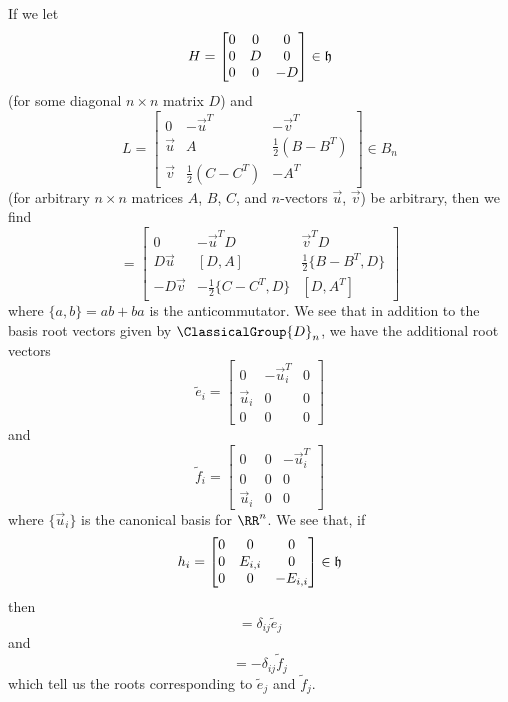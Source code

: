 If we let
\begin{equation}
H = \begin{bmatrix} 0&0&0\\
0&D&0\\
0&0&-D
\end{bmatrix}\in\frak{h}
\end{equation}
(for some diagonal $n\times n$ matrix $D$) and
\begin{equation}
L=\begin{bmatrix}0&-\vec{u}^{T}&-\vec{v}^{T}\\
\vec{u}&A&\frac{1}{2}(B-B^{T})\\
\vec{v}&\frac{1}{2}(C-C^{T})&-A^{T}
\end{bmatrix}\in B_{n}
\end{equation}
(for arbitrary $n\times n$ matrices $A$, $B$, $C$, and
$n$-vectors $\vec{u}$, $\vec{v}$) be arbitrary, then we find
\begin{equation}
[H,L]=\begin{bmatrix} 0 & -\vec{u}^{T}D & \vec{v}^{T}D\\
D\vec{u}   & [D,A]                     & \frac{1}{2}\{B-B^{T},D\}\\
-D\vec{v}  & -\frac{1}{2}\{C-C^{T},D\} & [D,A^{T}]
\end{bmatrix}
\end{equation}
where $\{a,b\}=ab+ba$ is the anticommutator. We see that in
addition to the basis root vectors given by $\ClassicalGroup{D}_{n}$, we have the
additional root vectors
\begin{equation}
\widetilde{e}_{i}=\begin{bmatrix} 0 & -\vec{u}^{T}_{i} & 0\\
\vec{u}_{i}   & 0 & 0\\
0  & 0 & 0
\end{bmatrix}
\end{equation}
 and
\begin{equation}
\widetilde{f}_{i}=\begin{bmatrix} 0 & 0 & -\vec{u}^{T}_{i}\\
0   & 0 & 0\\
\vec{u}_{i}  & 0 & 0
\end{bmatrix}
\end{equation}
 where $\{\vec{u}_{i}\}$ is the canonical basis
for $\RR^{n}$. We see that, if
\begin{equation}
h_{i}=\begin{bmatrix}
0 & 0     & 0\\
0 & E_{i,i}  & 0\\
0 & 0     & -E_{i,i}
\end{bmatrix}\in\frak{h}
\end{equation}
then
\begin{equation}
[h_{i},\widetilde{e}_{j}]=\delta_{ij}\widetilde{e}_{j}
\end{equation}
and
\begin{equation}
[h_{i},\widetilde{f}_{j}]=-\delta_{ij}\widetilde{f}_{j}
\end{equation}
which tell us the roots corresponding to $\widetilde{e}_{j}$ and $\widetilde{f}_{j}$.


